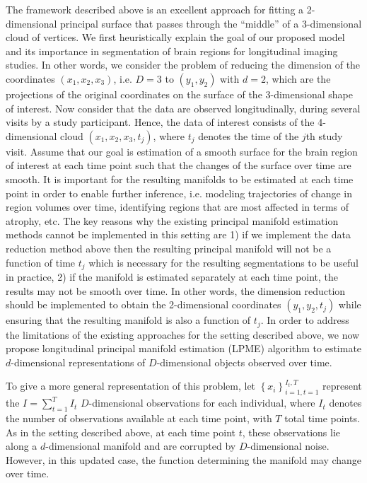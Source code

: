 \documentclass[11pt,reqno]{article}
\theoremstyle{definition}
\begin{document}
The framework described above is an excellent approach for fitting a 2-dimensional principal surface that passes through the ``middle'' of a 3-dimensional cloud of vertices. We first heuristically explain the goal of our proposed model and its importance in segmentation of brain regions for longitudinal imaging studies. In other words, we consider the problem of reducing the dimension of the coordinates $(x_1, x_2, x_3)$, i.e. $D=3$ to $(y_1,y_2)$ with $d=2$, which are the projections of the original coordinates on the surface of the 3-dimensional shape of interest. Now consider that the data are observed longitudinally, during several visits by a study participant. Hence, the data of interest consists of the 4-dimensional cloud $(x_1, x_2, x_3,t_j)$, where $t_j$ denotes the time of the $j$th study visit. Assume that our goal is estimation of a smooth surface for the brain region of interest at each time point such that the changes of the surface over time are smooth. It is important for the resulting manifolds to be estimated at each time point in order to enable further inference, i.e. modeling trajectories of change in region volumes over time, identifying regions that are most affected in terms of atrophy, etc. The key reasons why the existing principal manifold estimation methods cannot be implemented in this setting are 1) if we implement the data reduction method above then the resulting principal manifold will not be a function of time $t_j$ which is necessary for the resulting segmentations to be useful in practice, 2) if the manifold is estimated separately at each time point, the results may not be smooth over time. In other words, the dimension reduction should be implemented to obtain the 2-dimensional coordinates $(y_1,y_2,t_j)$ while ensuring that the resulting manifold is also a function of $t_j$. In order to address the limitations of the existing approaches for the setting described above, we now propose longitudinal principal manifold estimation (LPME) algorithm to estimate $d$-dimensional representations of $D$-dimensional objects observed over time. 

To give a more general representation of this problem, let $\left\{x_i\right\}_{i=1, t=1}^{I_t, T}$ represent the $I = \sum_{t=1}^{T}I_t$ $D$-dimensional observations for each individual, where $I_t$ denotes the number of observations available at each time point, with $T$ total time points. As in the setting described above, at each time point $t$, these observations lie along a $d$-dimensional manifold and are corrupted by $D$-dimensional noise. However, in this updated case, the function determining the manifold may change over time.
\end{document}
